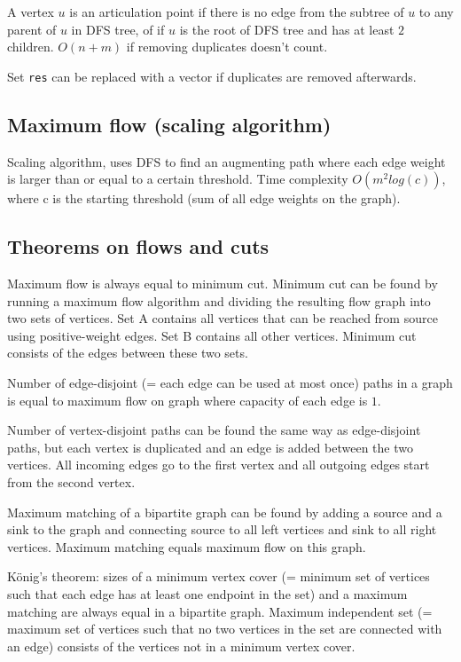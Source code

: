 \documentclass{article}
\begin{document}
A vertex $u$ is an articulation point if there is no edge from the subtree of $u$ to any parent of $u$ in DFS tree, of if $u$ is the root of DFS tree and has at least $2$ children. $O(n+m)$ if removing duplicates doesn't count.

Set \texttt{res} can be replaced with a vector if duplicates are removed afterwards.



\subsection {Maximum flow (scaling algorithm)}

Scaling algorithm, uses DFS to find an augmenting path where each edge weight is larger than or equal to a certain threshold. Time complexity $O(m^2log(c))$, where c is the starting threshold (sum of all edge weights on the graph).



\subsection {Theorems on flows and cuts}

Maximum flow is always equal to minimum cut. Minimum cut can be found by running a maximum flow algorithm and dividing the resulting flow graph into two sets of vertices. Set A contains all vertices that can be reached from source using positive-weight edges. Set B contains all other vertices. Minimum cut consists of the edges between these two sets.

Number of edge-disjoint (= each edge can be used at most once) paths in a graph is equal to maximum flow on graph where capacity of each edge is $1$.

Number of vertex-disjoint paths can be found the same way as edge-disjoint paths, but each vertex is duplicated and an edge is added between the two vertices. All incoming edges go to the first vertex and all outgoing edges start from the second vertex.

Maximum matching of a bipartite graph can be found by adding a source and a sink to the graph and connecting source to all left vertices and sink to all right vertices. Maximum matching equals maximum flow on this graph.

König's theorem: sizes of a minimum vertex cover (= minimum set of vertices such that each edge has at least one endpoint in the set) and a maximum matching are always equal in a bipartite graph. Maximum independent set (= maximum set of vertices such that no two vertices in the set are connected with an edge) consists of the vertices not in a minimum vertex cover.
\end{document}
